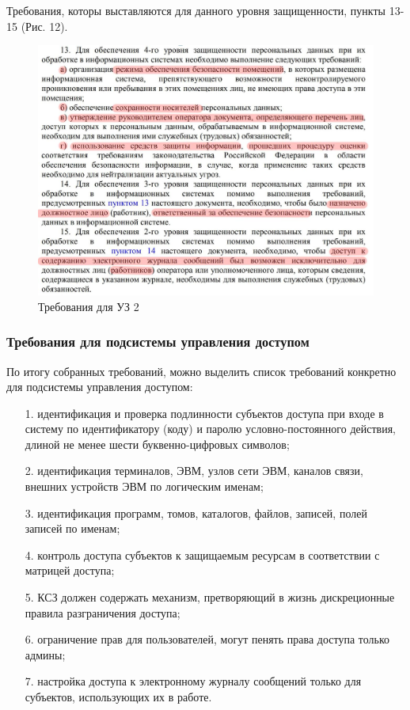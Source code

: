 Требования, которы выставляются для данного уровня защищенности, пункты 13-15 (Рис. 12). 

\begin{figure}[H]
  \centering
  \includegraphics[width=1\textwidth]{pict/5}
  \caption{Требования для УЗ 2}
  \label{fig:5}
\end{figure}

\subsubsection{Требования для подсистемы управления доступом}
По итогу собранных требований, можно выделить список требований конкретно для
подсистемы управления доступом:

\begin{itemize}
  \item[1.] идентификация и проверка подлинности субъектов доступа при входе в систему по идентификатору 
  (коду) и паролю условно-постоянного действия, длиной не менее шести буквенно-цифровых символов;
  \item[2.] идентификация терминалов, ЭВМ, узлов сети ЭВМ, каналов связи, внешних устройств ЭВМ по логическим именам;
  \item[3.] идентификация программ, томов, каталогов, файлов, записей, полей записей по именам;
  \item[4.] контроль доступа субъектов к защищаемым ресурсам в соответствии с матрицей доступа;
  \item[5.] КСЗ должен содержать механизм, претворяющий в жизнь дискреционные
  правила разграничения доступа;
  \item[6.] ограничение прав для пользователей, могут пенять права доступа только админы;
  \item[7.] настройка доступа к электронному журналу сообщений только для субъектов, использующих их в работе.
\end{itemize}
\newpage



